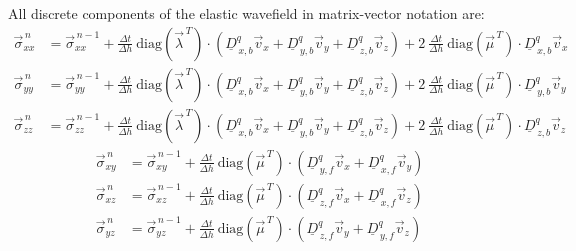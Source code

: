 \documentclass[pdftex,a4paper,parskip,listof=totoc,bibliography=totoc,onehalfspacing,12pt]{scrreprt}
\begin{document}
All discrete components of the elastic wavefield in matrix-vector notation are: 
\begin{align*}
	\vec{\sigma}_{xx}^{\,n} &= \vec{\sigma}_{xx}^{\,n-1} + \frac{\Delta t}{\Delta h}~ \mathrm{diag} \left( \vec{\lambda}^{\,T} \right) \cdot \left( \underline{D}_{\,x,b}^q \vec{v}_x +\underline{D}_{\,y,b}^q \vec{v}_y + \underline{D}_{\,z,b}^q \vec{v}_z \right) + 2~ \frac{\Delta t}{\Delta h} ~\mathrm{diag} \left( \vec{\mu}^{\,T} \right) \cdot \underline{D}_{\,x,b}^q \vec{v}_x\\
	\vec{\sigma}_{yy}^{\,n} &= \vec{\sigma}_{yy}^{\,n-1} + \frac{\Delta t}{\Delta h}~ \mathrm{diag} \left( \vec{\lambda}^{\,T} \right) \cdot \left( \underline{D}_{\,x,b}^q \vec{v}_x +\underline{D}_{\,y,b}^q \vec{v}_y + \underline{D}_{\,z,b}^q \vec{v}_z \right) + 2~ \frac{\Delta t}{\Delta h} ~\mathrm{diag} \left( \vec{\mu}^{\,T} \right) \cdot \underline{D}_{\,y,b}^q \vec{v}_y\\
	\vec{\sigma}_{zz}^{\,n} &= \vec{\sigma}_{zz}^{\,n-1} + \frac{\Delta t}{\Delta h}~ \mathrm{diag} \left( \vec{\lambda}^{\,T} \right) \cdot \left( \underline{D}_{\,x,b}^q \vec{v}_x +\underline{D}_{\,y,b}^q \vec{v}_y + \underline{D}_{\,z,b}^q \vec{v}_z \right) + 2~ \frac{\Delta t}{\Delta h} ~\mathrm{diag} \left( \vec{\mu}^{\,T} \right) \cdot \underline{D}_{\,z,b}^q \vec{v}_z
\end{align*}
\begin{align*}
	\vec{\sigma}_{xy}^{\,n} &= \vec{\sigma}_{xy}^{\,n-1} + \frac{\Delta t}{\Delta h}~ \mathrm{diag} \left( \vec{\mu}^{\,T} \right) \cdot \left( \underline{D}_{\,y,f}^q \vec{v}_x + \underline{D}_{\,x,f}^q \vec{v}_y \right)\\
	\vec{\sigma}_{xz}^{\,n} &= \vec{\sigma}_{xz}^{\,n-1} + \frac{\Delta t}{\Delta h}~ \mathrm{diag} \left( \vec{\mu}^{\,T} \right) \cdot \left( \underline{D}_{\,z,f}^q \vec{v}_x + \underline{D}_{\,x,f}^q \vec{v}_z \right)\\
	\vec{\sigma}_{yz}^{\,n} &= \vec{\sigma}_{yz}^{\,n-1} + \frac{\Delta t}{\Delta h}~ \mathrm{diag} \left( \vec{\mu}^{\,T} \right) \cdot \left( \underline{D}_{\,z,f}^q \vec{v}_y + \underline{D}_{\,y,f}^q \vec{v}_z \right)
\end{align*}
\end{document}

